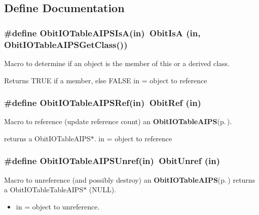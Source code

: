 \subsection{Define Documentation}
\subsubsection{\setlength{\rightskip}{0pt plus 5cm}\#define Obit\-IOTable\-AIPSIs\-A(in)\ Obit\-Is\-A (in, Obit\-IOTable\-AIPSGet\-Class())}\label{ObitIOTableAIPS_8h_a2}


Macro to determine if an object is the member of this or a derived class. 

Returns TRUE if a member, else FALSE in = object to reference 
\subsubsection{\setlength{\rightskip}{0pt plus 5cm}\#define Obit\-IOTable\-AIPSRef(in)\ Obit\-Ref (in)}\label{ObitIOTableAIPS_8h_a1}


Macro to reference (update reference count) an {\bf Obit\-IOTable\-AIPS}{\rm (p.\,\pageref{structObitIOTableAIPS})}. 

returns a Obit\-IOTable\-AIPS$\ast$. in = object to reference 
\subsubsection{\setlength{\rightskip}{0pt plus 5cm}\#define Obit\-IOTable\-AIPSUnref(in)\ Obit\-Unref (in)}\label{ObitIOTableAIPS_8h_a0}


Macro to unreference (and possibly destroy) an {\bf Obit\-IOTable\-AIPS}{\rm (p.\,\pageref{structObitIOTableAIPS})} returns a Obit\-IOTable\-Table\-AIPS$\ast$ (NULL). 

\begin{itemize}
\item in = object to unreference. \end{itemize}



